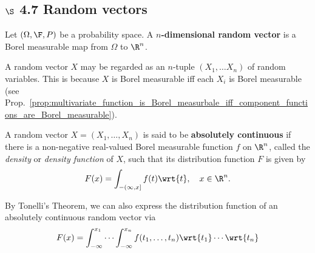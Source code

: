 \documentclass{article} %
\begin{document}
\subsection{$\S$ 4.7 Random vectors}

\begin{definition}
Let $(\Omega, \F, P)$ be a probability space.  A \textbf{ $n$-dimensional random vector} is a Borel measurable map from $\Omega$ to $\R^n$.
\end{definition}


\begin{remark}
A random vector $X$ may be regarded as an $n$-tuple $(X_1, \hdots X_n)$ of random variables.  This is because $X$ is Borel measurable iff each $X_i$ is Borel measurable (see Prop.~\ref{prop:multivariate_function_is_Borel_measurbale_iff_component_functions_are_Borel_measurable}).
\end{remark}

\begin{definition}{}
A random vector $X=(X_1,\hdots,X_n)$ is said to be \textbf{absolutely continuous} if there is a non-negative real-valued Borel measurable function $f$ on $\R^n$, called the \textit{density} or \textit{density function} of $X$, such that its distribution function $F$ is given by
\[ F(x) = \int_{-(\infty,x]} f(t) \wrt{t}, \quad x \in \R^n.\]
\label{def:absolutely_continuous_random_variable}
\end{definition}

\begin{remark}
By Tonelli's Theorem, we can also express the distribution function of an absolutely continuous random vector via
\[F(x) = \int_{-\infty}^{x_1} \cdots \int_{-\infty}^{x_n} f(t_1, \hdots, t_n) \wrt{t_1} \cdots \wrt{t_n} \]
\end{remark}
\end{document}
